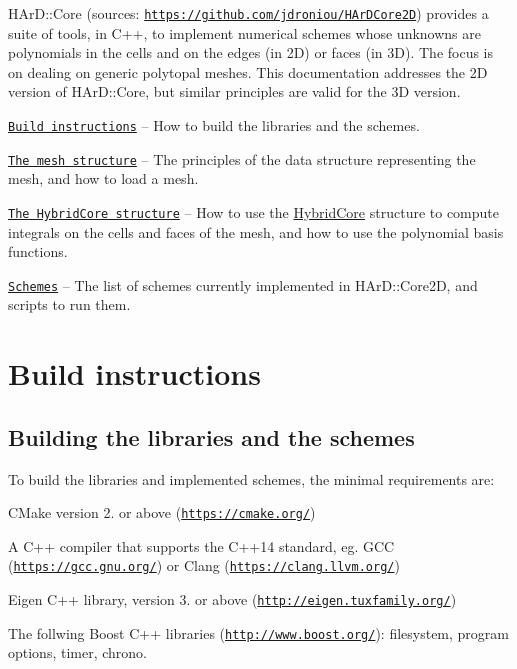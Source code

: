 H\+Ar\+D\+::\+Core (sources\+: \href{https://github.com/jdroniou/HArDCore2D}{\tt https\+://github.\+com/jdroniou/\+H\+Ar\+D\+Core2D}) provides a suite of tools, in C++, to implement numerical schemes whose unknowns are polynomials in the cells and on the edges (in 2D) or faces (in 3D). The focus is on dealing on generic polytopal meshes. This documentation addresses the 2D version of H\+Ar\+D\+::\+Core, but similar principles are valid for the 3D version.


\begin{DoxyItemize}
\item \href{#build}{\tt Build instructions} -- How to build the libraries and the schemes.
\item \href{#mesh}{\tt The mesh structure} -- The principles of the data structure representing the mesh, and how to load a mesh.
\item \href{#hybridcore}{\tt The Hybrid\+Core structure} -- How to use the \hyperlink{classHArDCore2D_1_1HybridCore}{Hybrid\+Core} structure to compute integrals on the cells and faces of the mesh, and how to use the polynomial basis functions.
\item \href{#schemes}{\tt Schemes} -- The list of schemes currently implemented in H\+Ar\+D\+::\+Core2D, and scripts to run them.
\end{DoxyItemize}

\label{_build}%
 \hypertarget{index_build}{}\section{Build instructions}\label{index_build}
\hypertarget{index_buildlib}{}\subsection{Building the libraries and the schemes}\label{index_buildlib}
To build the libraries and implemented schemes, the minimal requirements are\+:


\begin{DoxyItemize}
\item C\+Make version 2. or above (\href{https://cmake.org/}{\tt https\+://cmake.\+org/})
\item A C++ compiler that supports the C++14 standard, eg. G\+CC (\href{https://gcc.gnu.org/}{\tt https\+://gcc.\+gnu.\+org/}) or Clang (\href{https://clang.llvm.org/}{\tt https\+://clang.\+llvm.\+org/})
\item Eigen C++ library, version 3. or above (\href{http://eigen.tuxfamily.org/}{\tt http\+://eigen.\+tuxfamily.\+org/})
\item The follwing Boost C++ libraries (\href{http://www.boost.org/}{\tt http\+://www.\+boost.\+org/})\+: filesystem, program options, timer, chrono.
\end{DoxyItemize}

